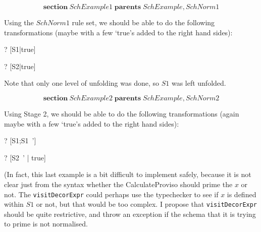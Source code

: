 \documentclass{article}
\newenvironment{zsection}{\[}{\]}
\newcommand{\SECTION}{\textbf{section}~}
\newcommand{\parents}{\mathrel{\textbf{parents}}}
\begin{document}
\begin{zsection}
  \SECTION SchExample1 \parents SchExample, SchNorm1
\end{zsection}

Using the $SchNorm1$ rule set, we should be able to
do the following transformations (maybe with a few
`true's added to the right hand sides):

\begin{zed}
\vdash? [S1|true] \unfoldsTo [x:\nat | x<10]
\end{zed}
\begin{zed}
\vdash? [S2|true] \unfoldsTo [S1; y:\nat | y<x]
\end{zed}

Note that only one level of unfolding was done, so $S1$ was left unfolded.



\begin{zsection}
  \SECTION SchExample2 \parents SchExample, SchNorm2
\end{zsection}

Using Stage 2, we should be able to
do the following transformations (again maybe with a few
`true's added to the right hand sides):

\begin{zed}
\vdash? [S1;S1~'] 
\end{zed}
\begin{zed}
\vdash? [S2~' | true] \unfoldsTo [S1~'; y':\nat | y'<x']
\end{zed}

(In fact, this last example is a bit difficult to implement safely,
because it is not clear just from the syntax whether the CalculateProviso
should prime the $x$ or not.  The \verb!visitDecorExpr! could perhaps
use the typechecker to see if $x$ is defined within $S1$ or not, but
that would be too complex.  I propose that \verb!visitDecorExpr! should
be quite restrictive, and throw an exception if the schema that it
is trying to prime is not normalised.
\end{document}
